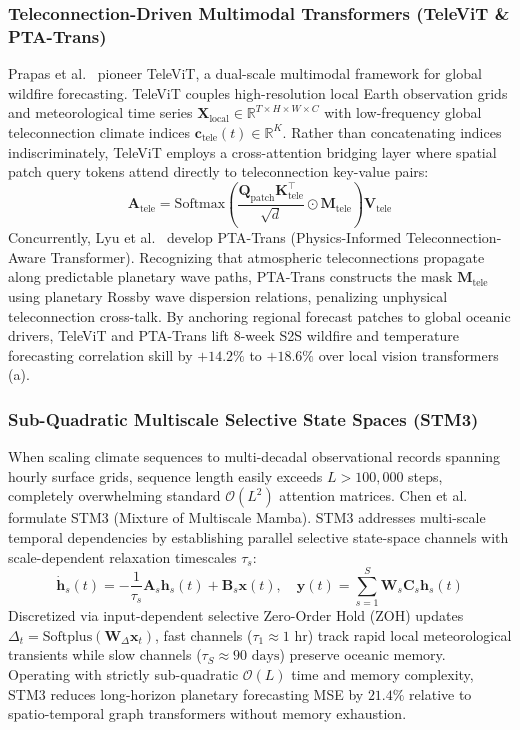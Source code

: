 \subsubsection{Teleconnection-Driven Multimodal Transformers (TeleViT \& PTA-Trans)}
Prapas et al.~\cite{Prapas2023TeleViT} pioneer TeleViT, a dual-scale multimodal framework for global wildfire forecasting. TeleViT couples high-resolution local Earth observation grids and meteorological time series $\mathbf{X}_{\text{local}} \in \mathbb{R}^{T \times H \times W \times C}$ with low-frequency global teleconnection climate indices $\mathbf{c}_{\text{tele}}(t) \in \mathbb{R}^K$. Rather than concatenating indices indiscriminately, TeleViT employs a cross-attention bridging layer where spatial patch query tokens attend directly to teleconnection key-value pairs:
\begin{equation}
    \mathbf{A}_{\text{tele}} = \text{Softmax}\left(\frac{\mathbf{Q}_{\text{patch}} \mathbf{K}_{\text{tele}}^\top}{\sqrt{d}} \odot \mathbf{M}_{\text{tele}}\right) \mathbf{V}_{\text{tele}}
\end{equation}
Concurrently, Lyu et al.~\cite{Lyu2025PTATrans} develop PTA-Trans (Physics-Informed Teleconnection-Aware Transformer). Recognizing that atmospheric teleconnections propagate along predictable planetary wave paths, PTA-Trans constructs the mask $\mathbf{M}_{\text{tele}}$ using planetary Rossby wave dispersion relations, penalizing unphysical teleconnection cross-talk. By anchoring regional forecast patches to global oceanic drivers, TeleViT and PTA-Trans lift 8-week S2S wildfire and temperature forecasting correlation skill by $+14.2\%$ to $+18.6\%$ over local vision transformers (a).

\subsubsection{Sub-Quadratic Multiscale Selective State Spaces (STM3)}
When scaling climate sequences to multi-decadal observational records spanning hourly surface grids, sequence length easily exceeds $L > 100{,}000$ steps, completely overwhelming standard $\mathcal{O}(L^2)$ attention matrices. Chen et al.~\cite{Chen2025STM3} formulate STM3 (Mixture of Multiscale Mamba). STM3 addresses multi-scale temporal dependencies by establishing parallel selective state-space channels with scale-dependent relaxation timescales $\tau_s$:
\begin{equation}
    \dot{\mathbf{h}}_s(t) = -\frac{1}{\tau_s} \mathbf{A}_s \mathbf{h}_s(t) + \mathbf{B}_s \mathbf{x}(t), \quad \mathbf{y}(t) = \sum_{s=1}^S \mathbf{W}_s \mathbf{C}_s \mathbf{h}_s(t)
\end{equation}
Discretized via input-dependent selective Zero-Order Hold (ZOH) updates $\Delta_t = \text{Softplus}(\mathbf{W}_\Delta \mathbf{x}_t)$, fast channels ($\tau_1 \approx 1\text{ hr}$) track rapid local meteorological transients while slow channels ($\tau_S \approx 90\text{ days}$) preserve oceanic memory. Operating with strictly sub-quadratic $\mathcal{O}(L)$ time and memory complexity, STM3 reduces long-horizon planetary forecasting MSE by $21.4\%$ relative to spatio-temporal graph transformers without memory exhaustion.

